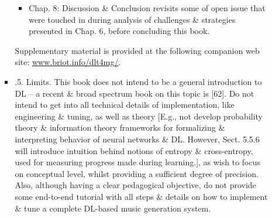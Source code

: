 \documentclass{article}
\begin{document}
\begin{itemize}
\begin{itemize}
\begin{itemize}
\begin{itemize}
				\item {\sf Chap. 8: Discussion \& Conclusion} revisits some of open issue that were touched in during analysis of challenges \& strategies presented in Chap. 6, before concluding this book.
			\end{itemize}
			Supplementary material is provided at the following companion web site: \url{www.briot.info/dlt4mg/}.
			\item {.5. Limits.} This book does not intend to be a general introduction to DL -- a recent \& broad spectrum book on this topic is [62]. Do not intend to get into all technical details of implementation, like engineering \& tuning, as well as theory [E.g., not develop probability theory \& information theory frameworks for formalizing \& interpreting behavior of neural networks \& DL. However, Sect. 5.5.6 will introduce intuition behind notions of entropy \& cross-entropy, used for measuring progress made during learning.], as wish to focus on conceptual level, whilst providing a sufficient degree of precision. Also, although having a clear pedagogical objective, do not provide some end-to-end tutorial with all steps \& details on how to implement \& tune a complete DL-based music generation system.


\end{itemize}
\end{itemize}
\end{itemize}
\end{document}
